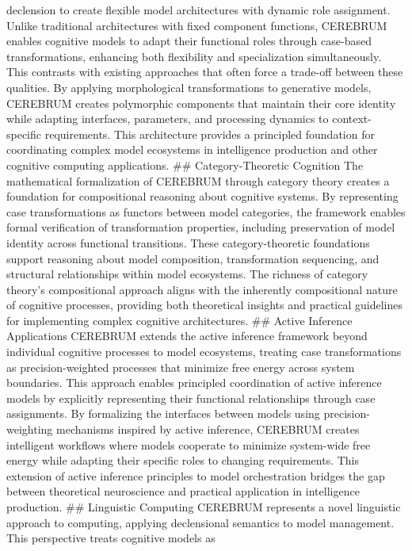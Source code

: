 \documentclass[
  11pt,
  letterpaper,
]{article}
\begin{document}
declension to create flexible model architectures with dynamic role
assignment. Unlike traditional architectures with fixed component
functions, CEREBRUM enables cognitive models to adapt their functional
roles through case-based transformations, enhancing both flexibility and
specialization simultaneously. This contrasts with existing approaches
that often force a trade-off between these qualities. By applying
morphological transformations to generative models, CEREBRUM creates
polymorphic components that maintain their core identity while adapting
interfaces, parameters, and processing dynamics to context-specific
requirements. This architecture provides a principled foundation for
coordinating complex model ecosystems in intelligence production and
other cognitive computing applications. \#\# Category-Theoretic
Cognition The mathematical formalization of CEREBRUM through category
theory creates a foundation for compositional reasoning about cognitive
systems. By representing case transformations as functors between model
categories, the framework enables formal verification of transformation
properties, including preservation of model identity across functional
transitions. These category-theoretic foundations support reasoning
about model composition, transformation sequencing, and structural
relationships within model ecosystems. The richness of category theory's
compositional approach aligns with the inherently compositional nature
of cognitive processes, providing both theoretical insights and
practical guidelines for implementing complex cognitive architectures.
\#\# Active Inference Applications CEREBRUM extends the active inference
framework beyond individual cognitive processes to model ecosystems,
treating case transformations as precision-weighted processes that
minimize free energy across system boundaries. This approach enables
principled coordination of active inference models by explicitly
representing their functional relationships through case assignments. By
formalizing the interfaces between models using precision-weighting
mechanisms inspired by active inference, CEREBRUM creates intelligent
workflows where models cooperate to minimize system-wide free energy
while adapting their specific roles to changing requirements. This
extension of active inference principles to model orchestration bridges
the gap between theoretical neuroscience and practical application in
intelligence production. \#\# Linguistic Computing CEREBRUM represents a
novel linguistic approach to computing, applying declensional semantics
to model management. This perspective treats cognitive models as
\end{document}
